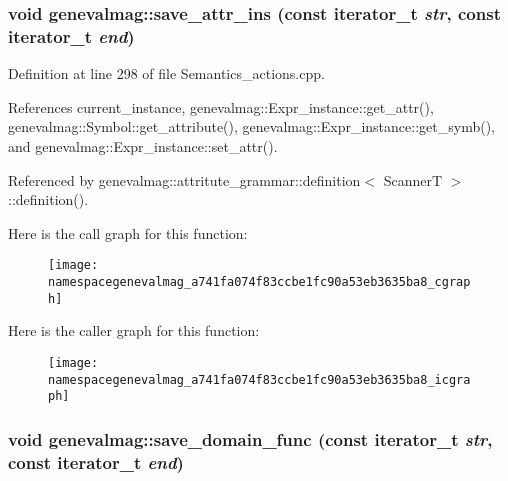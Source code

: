 \hypertarget{namespacegenevalmag_a741fa074f83ccbe1fc90a53eb3635ba8}{
\subsubsection[{save\_\-attr\_\-ins}]{\setlength{\rightskip}{0pt plus 5cm}void genevalmag::save\_\-attr\_\-ins (const iterator\_\-t {\em str}, \/  const iterator\_\-t {\em end})}}
\label{namespacegenevalmag_a741fa074f83ccbe1fc90a53eb3635ba8}


Definition at line 298 of file Semantics\_\-actions.cpp.



References current\_\-instance, genevalmag::Expr\_\-instance::get\_\-attr(), genevalmag::Symbol::get\_\-attribute(), genevalmag::Expr\_\-instance::get\_\-symb(), and genevalmag::Expr\_\-instance::set\_\-attr().



Referenced by genevalmag::attritute\_\-grammar::definition$<$ ScannerT $>$::definition().



Here is the call graph for this function:\nopagebreak
\begin{figure}[H]
\begin{center}
\leavevmode
\texttt{[image: namespacegenevalmag\_a741fa074f83ccbe1fc90a53eb3635ba8\_cgraph]}
\end{center}
\end{figure}




Here is the caller graph for this function:\nopagebreak
\begin{figure}[H]
\begin{center}
\leavevmode
\texttt{[image: namespacegenevalmag\_a741fa074f83ccbe1fc90a53eb3635ba8\_icgraph]}
\end{center}
\end{figure}


\hypertarget{namespacegenevalmag_ae333368e344fd2e4542788afb8d9990e}{
\subsubsection[{save\_\-domain\_\-func}]{\setlength{\rightskip}{0pt plus 5cm}void genevalmag::save\_\-domain\_\-func (const iterator\_\-t {\em str}, \/  const iterator\_\-t {\em end})}}
\label{namespacegenevalmag_ae333368e344fd2e4542788afb8d9990e}


